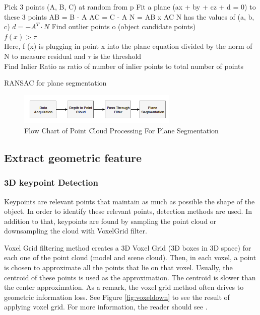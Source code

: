 \begin{algorithm}[H]
\SetAlgoLined
{}
 {
 Pick 3 points (A, B, C) at random from p \;
 Fit a plane (ax + by + cz + d = 0) to these 3 points\;
    AB = B - A\;
    AC = C - A\;
    N = AB x AC\;
    N has the values of (a, b, c)\;
    $d = -A^{T} \cdot N$\; 
    Find outlier points o (object candidate points)\\
    $f(x)> \tau$ \\
    Here, f (x) is plugging in point x into the plane equation divided by the norm of N to measure residual and $\tau$ is the threshold\\
    Find Inlier Ratio as ratio of number of inlier points to total number of points
}
\caption{RANSAC for plane segmentation
\label{alg:algPlane}
\cite{cadPipeline3}}
\end{algorithm}

\begin{figure}[!h]
\begin{center}
\includegraphics[width=3in]{diagrams/planesegmentation.png}
\caption{Flow Chart of Point Cloud Processing For Plane Segmentation}
\label{fig:planesegmentation}
\end{center}
\end{figure}

\subsection{Extract geometric feature}
\subsubsection{3D keypoint Detection}

Keypoints are relevant points that maintain as much as possible the shape of the object. In order to identify these relevant points, detection methods are used. In addition to that, keypoints are found by sampling the point cloud or downsampling the cloud with  VoxelGrid filter.

Voxel Grid filtering method \cite{algFiltering} creates a 3D Voxel Grid
(3D boxes in 3D space) for each one of the point cloud (model and scene cloud). Then, in each voxel, a point is chosen to approximate all the points that lie on that voxel. Usually, the centroid of these points is used as the approximation. The centroid is slower than the center approximation. As a remark, the voxel grid method often drives to geometric information loss. See Figure \ref{fig:voxeldown} to see the result of applying voxel grid. For more information, the reader should see \cite{algDownsampling}.


